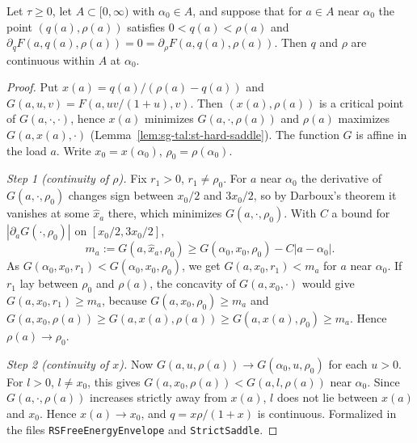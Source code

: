 \begin{lemma}\label{lem:sg-tal:st-branch-continuity}
  \leanok
Let $\tau\ge0$, let $A\subset[0,\infty)$ with $\alpha_0\in A$, and suppose that for $a\in A$ near $\alpha_0$
the point $(q(a),\rho(a))$ satisfies $0<q(a)<\rho(a)$ and
$\partial_qF(a,q(a),\rho(a))=0=\partial_\rho F(a,q(a),\rho(a))$. Then $q$ and $\rho$ are continuous within
$A$ at $\alpha_0$.
\end{lemma}
\begin{proof}
  \leanok
Put $x(a)=q(a)/(\rho(a)-q(a))$ and $G(a,u,v)=F(a,uv/(1+u),v)$. Then $(x(a),\rho(a))$ is a critical point
of $G(a,\cdot,\cdot)$, hence
$x(a)$ minimizes $G(a,\cdot,\rho(a))$ and $\rho(a)$ maximizes $G(a,x(a),\cdot)$
(Lemma~\ref{lem:sg-tal:st-hard-saddle}). The function $G$ is affine in the load $a$. Write
$x_0=x(\alpha_0)$, $\rho_0=\rho(\alpha_0)$.

\emph{Step 1 (continuity of $\rho$).} Fix $r_1>0$, $r_1\ne\rho_0$. For $a$ near $\alpha_0$ the derivative of
$G(a,\cdot,\rho_0)$ changes sign between $x_0/2$ and $3x_0/2$, so by Darboux's theorem it vanishes at some
$\hat x_a$ there, which minimizes $G(a,\cdot,\rho_0)$. With $C$ a bound for $|\partial_aG(\cdot,\rho_0)|$ on
$[x_0/2,3x_0/2]$,
\[
m_a:=G(a,\hat x_a,\rho_0)\ge G(\alpha_0,x_0,\rho_0)-C|a-\alpha_0| .
\]
As $G(\alpha_0,x_0,r_1)<G(\alpha_0,x_0,\rho_0)$, we get $G(a,x_0,r_1)<m_a$ for $a$ near $\alpha_0$. If $r_1$
lay between $\rho_0$ and $\rho(a)$, the concavity of $G(a,x_0,\cdot)$ would give
$G(a,x_0,r_1)\ge m_a$, because $G(a,x_0,\rho_0)\ge m_a$ and
$G(a,x_0,\rho(a))\ge G(a,x(a),\rho(a))\ge G(a,x(a),\rho_0)\ge m_a$. Hence $\rho(a)\to\rho_0$.

\emph{Step 2 (continuity of $x$).} Now $G(a,u,\rho(a))\to G(\alpha_0,u,\rho_0)$ for each $u>0$. For $l>0$,
$l\ne x_0$, this gives $G(a,x_0,\rho(a))<G(a,l,\rho(a))$ near $\alpha_0$. Since $G(a,\cdot,\rho(a))$ increases
strictly away from $x(a)$, $l$ does not lie between $x(a)$ and $x_0$. Hence $x(a)\to x_0$, and
$q=x\rho/(1+x)$ is continuous.
Formalized in the files \texttt{RSFreeEnergyEnvelope} and \texttt{StrictSaddle}.
\end{proof}

